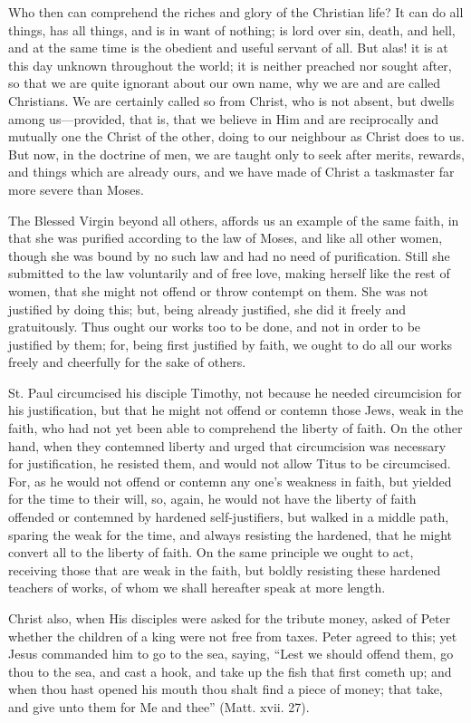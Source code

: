 Who then can comprehend the riches and glory of the Christian life? It can
do all things, has all things, and is in want of nothing; is lord over
sin, death, and hell, and at the same time is the obedient and useful
servant of all. But alas! it is at this day unknown throughout the world;
it is neither preached nor sought after, so that we are quite ignorant
about our own name, why we are and are called Christians. We are certainly
called so from Christ, who is not absent, but dwells among us—provided,
that is, that we believe in Him and are reciprocally and mutually one the
Christ of the other, doing to our neighbour as Christ does to us. But now,
in the doctrine of men, we are taught only to seek after merits, rewards,
and things which are already ours, and we have made of Christ a taskmaster
far more severe than Moses.

The Blessed Virgin beyond all others, affords us an example of the same
faith, in that she was purified according to the law of Moses, and like
all other women, though she was bound by no such law and had no need of
purification. Still she submitted to the law voluntarily and of free love,
making herself like the rest of women, that she might not offend or throw
contempt on them. She was not justified by doing this; but, being already
justified, she did it freely and gratuitously. Thus ought our works too to
be done, and not in order to be justified by them; for, being first
justified by faith, we ought to do all our works freely and cheerfully for
the sake of others.

St. Paul circumcised his disciple Timothy, not because he needed
circumcision for his justification, but that he might not offend or
contemn those Jews, weak in the faith, who had not yet been able to
comprehend the liberty of faith. On the other hand, when they contemned
liberty and urged that circumcision was necessary for justification, he
resisted them, and would not allow Titus to be circumcised. For, as he
would not offend or contemn any one's weakness in faith, but yielded for
the time to their will, so, again, he would not have the liberty of faith
offended or contemned by hardened self-justifiers, but walked in a middle
path, sparing the weak for the time, and always resisting the hardened,
that he might convert all to the liberty of faith. On the same principle
we ought to act, receiving those that are weak in the faith, but boldly
resisting these hardened teachers of works, of whom we shall hereafter
speak at more length.

Christ also, when His disciples were asked for the tribute money, asked of
Peter whether the children of a king were not free from taxes. Peter
agreed to this; yet Jesus commanded him to go to the sea, saying, ``Lest we
should offend them, go thou to the sea, and cast a hook, and take up the
fish that first cometh up; and when thou hast opened his mouth thou shalt
find a piece of money; that take, and give unto them for Me and thee''
(Matt. xvii. 27).

